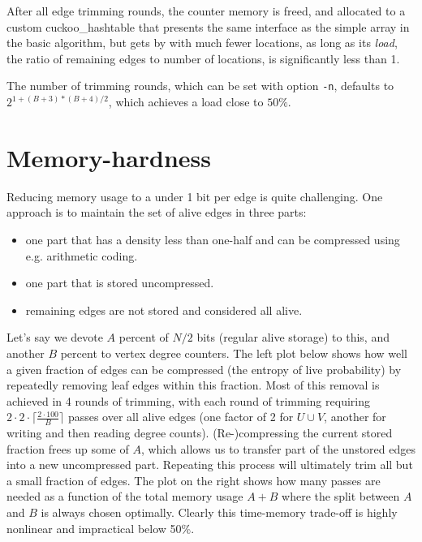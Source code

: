 \documentclass[11pt, oneside]{article}
\begin{document}
After all edge trimming rounds, the counter memory is freed, and allocated to a
custom cuckoo\_hashtable that presents the same interface as the simple array in
the basic algorithm, but gets by with much fewer locations, as long as its {\em load},
the ratio of remaining edges to number of locations, is significantly less than 1.

The number of trimming rounds, which can be set with option {\tt -n}, defaults to
$2^{1+(B+3)*(B+4)/2}$, which achieves a load close to $50\%$.

\section{Memory-hardness}
Reducing memory usage to a under 1 bit per edge is quite challenging.
One approach is to maintain the set of alive edges in three parts:
\begin{itemize}
\item one part that has a density less than one-half and can be compressed using
e.g. arithmetic coding.
\item one part that is stored uncompressed.
\item remaining edges are not stored and considered all alive.
\end{itemize}
Let's say we devote $A$ percent of $N/2$ bits (regular alive storage) to this, and another
$B$ percent to vertex degree counters. The left plot below shows how well a given fraction
of edges can be compressed (the entropy of live probability)
by repeatedly removing leaf edges within this fraction. Most
of this removal is achieved in 4 rounds of trimming, with each round of trimming requiring
$2\cdot2\cdot\lceil \frac{2\cdot 100}{B} \rceil$ passes over all alive edges
(one factor of 2 for $U \cup V$, another for writing and then reading degree counts).
(Re-)compressing the current stored fraction frees up some of $A$,
which allows us to transfer part of the unstored edges into a new uncompressed part.
Repeating this process will ultimately trim all but a small fraction of edges.
The plot on the right shows how many passes are needed as a function of the total
memory usage $A+B$ where the split between $A$ and $B$ is always chosen optimally.
Clearly this time-memory trade-off is highly nonlinear and impractical below 50\%.
\end{document}
